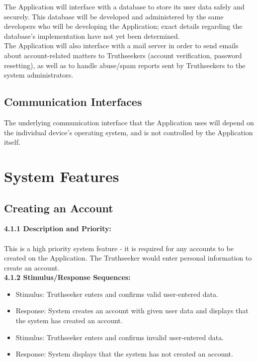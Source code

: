 The Application will interface with a database to store its user data safely and securely. This database will be developed and administered by the same developers who will be developing the Application; exact details regarding the database’s implementation have not yet been determined. \\

The Application will also interface with a mail server in order to send emails about account-related matters to Truthseekers (account verification, password resetting), as well as to handle abuse/spam reports sent by Truthseekers to the system administrators.


\section{Communication Interfaces}

The underlying communication interface that the Application uses will depend on the individual device’s operating system, and is not controlled by the Application itself.

\newpage

\chapter{System Features}
\label{SystemFeatures}

\section{Creating an Account}
    \quad \textbf{4.1.1 \quad Description and Priority:} \\ \\
    \null \quad
    This is a high priority system feature - it is required for any accounts to be created on the Application. The Truthseeker would enter personal information to create an account. \\

    \quad \textbf{4.1.2 \quad Stimulus/Response Sequences:}
    \begin{itemize}
    \item[] Stimulus: \thinspace \quad Truthseeker enters and confirms valid user-entered data.
    \item[] Response: \quad System creates an account with given user data and displays that the system has created an account.
    \item[] Stimulus: \quad Truthseeker enters and confirms invalid user-entered data.
    \item[] Response: \quad System displays that the system has not created an account.
    \end{itemize}
    
